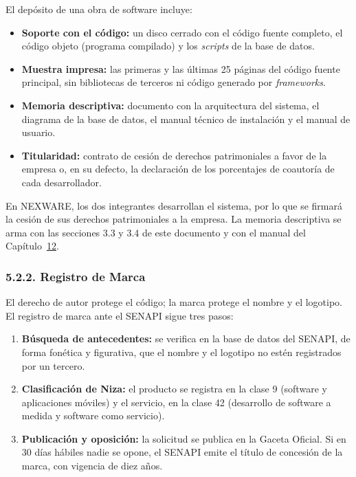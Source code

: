 El depósito de una obra de software incluye:

\begin{itemize}
    \item \textbf{Soporte con el código:} un disco cerrado con el código fuente completo, el código objeto (programa compilado) y los \textit{scripts} de la base de datos.
    \item \textbf{Muestra impresa:} las primeras y las últimas 25 páginas del código fuente principal, sin bibliotecas de terceros ni código generado por \textit{frameworks}.
    \item \textbf{Memoria descriptiva:} documento con la arquitectura del sistema, el diagrama de la base de datos, el manual técnico de instalación y el manual de usuario.
    \item \textbf{Titularidad:} contrato de cesión de derechos patrimoniales a favor de la empresa o, en su defecto, la declaración de los porcentajes de coautoría de cada desarrollador.
\end{itemize}

En NEXWARE, los dos integrantes desarrollan el sistema, por lo que se firmará la cesión de sus derechos patrimoniales a la empresa. La memoria descriptiva se arma con las secciones 3.3 y 3.4 de este documento y con el manual del Capítulo~\hyperref[cap:producto]{12}.

\subsubsection{5.2.2. Registro de Marca}

El derecho de autor protege el código; la marca protege el nombre y el logotipo. El registro de marca ante el SENAPI sigue tres pasos:

\begin{enumerate}
    \item \textbf{Búsqueda de antecedentes:} se verifica en la base de datos del SENAPI, de forma fonética y figurativa, que el nombre y el logotipo no estén registrados por un tercero.
    \item \textbf{Clasificación de Niza:} el producto se registra en la clase 9 (software y aplicaciones móviles) y el servicio, en la clase 42 (desarrollo de software a medida y software como servicio).
    \item \textbf{Publicación y oposición:} la solicitud se publica en la Gaceta Oficial. Si en 30 días hábiles nadie se opone, el SENAPI emite el título de concesión de la marca, con vigencia de diez años.
\end{enumerate}

